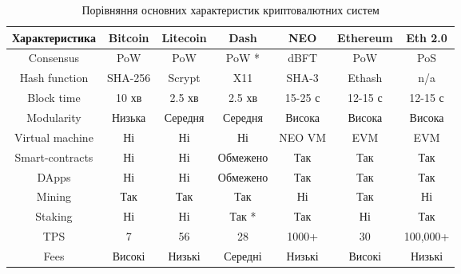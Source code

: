 \begin{table}[h!]
\centering
\begin{tabular}{|c|c|c|c|c|c|c|}
\hline
\cellcolor{lightgray!25}\textbf{Характеристика} & \cellcolor{lightgray!25}\textbf{Bitcoin} & \cellcolor{lightgray!25}\textbf{Litecoin} & \cellcolor{lightgray!25}\textbf{ Dash } & \cellcolor{lightgray!25}\textbf{ NEO } & \cellcolor{lightgray!25}\textbf{Ethereum} & \cellcolor{lightgray!25}\textbf{Eth 2.0} \\
\hline
Consensus & \cellcolor{yellow!25}PoW & \cellcolor{yellow!25}PoW & \cellcolor{yellow!25}PoW * & \cellcolor{green!25}dBFT & \cellcolor{yellow!25}PoW & \cellcolor{green!25}PoS \\
\hline
Hash function & \cellcolor{green!25}SHA-256 & \cellcolor{yellow!25}Scrypt & \cellcolor{green!25}X11 & \cellcolor{green!25}SHA-3 & \cellcolor{yellow!25}Ethash & \cellcolor{green!25}n/a \\
\hline
Block time & \cellcolor{red!25}10 хв & \cellcolor{yellow!25}2.5 хв & \cellcolor{yellow!25}2.5 хв & \cellcolor{green!25}15-25 с & \cellcolor{green!25}12-15 с & \cellcolor{green!25}12-15 с \\
\hline
Modularity & \cellcolor{red!25}Низька & \cellcolor{yellow!25}Середня & \cellcolor{yellow!25}Середня & \cellcolor{green!25}Висока & \cellcolor{green!25}Висока & \cellcolor{green!25}Висока \\
\hline
Virtual machine & \cellcolor{red!25}Ні & \cellcolor{red!25}Ні & \cellcolor{red!25}Ні & \cellcolor{green!25}NEO VM & \cellcolor{green!25}EVM & \cellcolor{green!25}EVM \\
\hline
Smart-contracts & \cellcolor{red!25}Ні & \cellcolor{red!25}Ні & \cellcolor{yellow!25}Обмежено & \cellcolor{green!25}Так & \cellcolor{green!25}Так & \cellcolor{green!25}Так \\
\hline
DApps & \cellcolor{red!25}Ні & \cellcolor{red!25}Ні & \cellcolor{yellow!25}Обмежено & \cellcolor{green!25}Так & \cellcolor{green!25}Так & \cellcolor{green!25}Так \\
\hline
Mining & \cellcolor{green!25}Так & \cellcolor{green!25}Так & \cellcolor{green!25}Так & \cellcolor{red!25}Ні & \cellcolor{green!25}Так & \cellcolor{red!25}Ні \\
\hline
Staking & \cellcolor{red!25}Ні & \cellcolor{red!25}Ні & \cellcolor{green!25}Так * & \cellcolor{green!25}Так & \cellcolor{red!25}Ні & \cellcolor{green!25}Так \\
\hline
TPS & \cellcolor{red!25}7 & \cellcolor{yellow!25}56 & \cellcolor{red!25}28 & \cellcolor{green!25}1000+ & \cellcolor{red!25}30 & \cellcolor{green!25}100,000+ \\
\hline
Fees & \cellcolor{red!25}Високі & \cellcolor{green!25}Низькі & \cellcolor{yellow!25}Середні & \cellcolor{green!25}Низькі & \cellcolor{red!25}Високі & \cellcolor{green!25}Низькі \\
\hline
\end{tabular}
\caption{Порівняння основних характеристик криптовалютних систем}
\label{table
}
\end{table}

